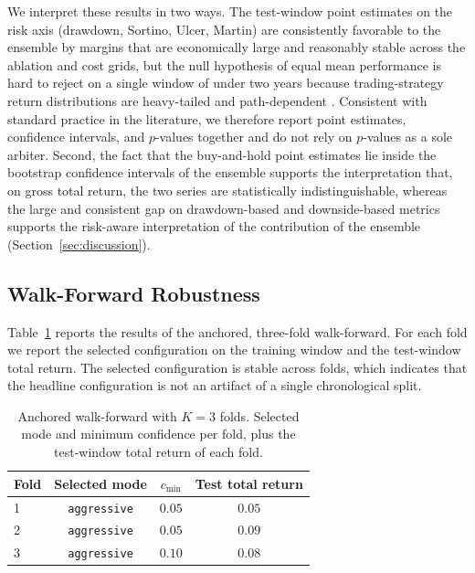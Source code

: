 \documentclass{ieeeaccess}
\begin{document}
We interpret these results in two ways. The test-window point estimates on the risk axis (drawdown, Sortino, Ulcer, Martin) are consistently favorable to the ensemble by margins that are economically large and reasonably stable across the ablation and cost grids, but the null hypothesis of equal mean performance is hard to reject on a single window of under two years because trading-strategy return distributions are heavy-tailed and path-dependent \cite{politis1994,bailey2014}. Consistent with standard practice in the literature, we therefore report point estimates, confidence intervals, and $p$-values together and do not rely on $p$-values as a sole arbiter. Second, the fact that the buy-and-hold point estimates lie inside the bootstrap confidence intervals of the ensemble supports the interpretation that, on gross total return, the two series are statistically indistinguishable, whereas the large and consistent gap on drawdown-based and downside-based metrics supports the risk-aware interpretation of the contribution of the ensemble (Section~\ref{sec:discussion}).

\subsection{Walk-Forward Robustness}
\label{subsec:kfold}

Table~\ref{tab:kfold} reports the results of the anchored, three-fold walk-forward. For each fold we report the selected configuration on the training window and the test-window total return. The selected configuration is stable across folds, which indicates that the headline configuration is not an artifact of a single chronological split.

\begin{table}[t]
\centering
\caption{Anchored walk-forward with $K = 3$ folds. Selected mode and minimum confidence per fold, plus the test-window total return of each fold.}
\label{tab:kfold}
\begin{tabular}{lccc}
\toprule
Fold & Selected mode & $c_{\min}$ & Test total return \\
\midrule
1 & \texttt{aggressive} & $0.05$ & $0.05$ \\
2 & \texttt{aggressive} & $0.05$ & $0.09$ \\
3 & \texttt{aggressive} & $0.10$ & $0.08$ \\
\bottomrule
\end{tabular}
\end{table}

\end{document}
